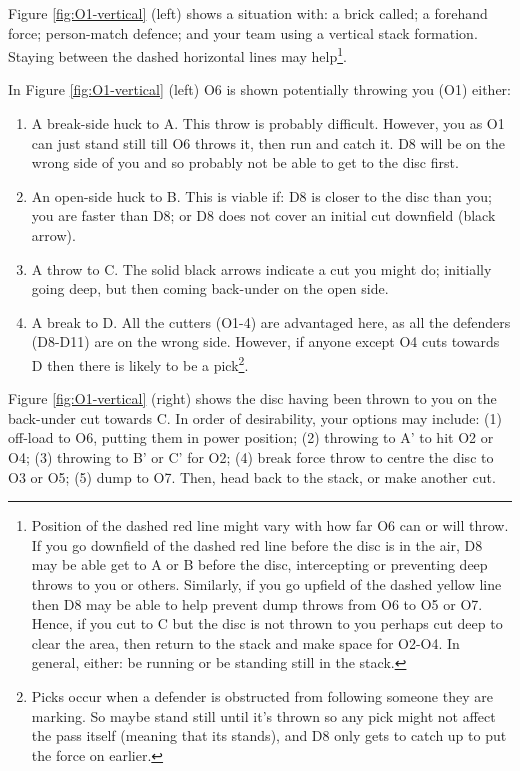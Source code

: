 \documentclass{tufte-handout}
\begin{document}
Figure \ref{fig:O1-vertical} (left) shows 
a situation 
with: 
a brick called;
a forehand force; 
person-match defence; 
and your team using 
a vertical stack formation.
Staying  
between 
the dashed 
horizontal 
lines 
may help\footnote{
Position of 
the dashed red line might vary
with how far O6 
can or will 
throw. 
If you go 
downfield of the dashed red line 
before the disc is in the air,
D8 may be able 
get to
A or B 
before the disc,
intercepting 
or preventing 
deep throws to 
you or others. 
Similarly, 
if you go 
upfield of the dashed yellow line
then D8 may 
be able to help
prevent dump throws from O6
to O5 
or O7.
Hence,
if you cut to C
but the disc is not thrown to you
perhaps cut deep 
to clear the area, 
then return to the stack
and make space for O2-O4. 
In general, 
either: 
be running 
or be standing still 
in the stack.}. 

In Figure \ref{fig:O1-vertical} (left)
O6 is shown
potentially throwing 
you (O1) either:
\begin{enumerate}
\item A break-side 
huck to A.
This throw is 
probably 
difficult. 
However, you as O1
can just
stand still 
till O6 throws it, 
then run and catch it.
D8 will be on the wrong side of you
and so probably 
not be able 
to get to the disc
first.
\item An open-side huck to B. 
This is viable if: 
D8 is closer to the disc than you; 
you are faster than D8; or 
D8 does not cover 
an initial cut downfield (black arrow). 
\item A throw 
to C.
The solid black arrows indicate 
a cut you might do;
initially going deep,
but then coming back-under
on the open side. 
\item A break to D. 
All the cutters 
(O1-4) 
are advantaged here,
as all the defenders 
(D8-D11) 
are on the wrong side.
However,
if anyone 
except O4 
cuts towards D 
then there is likely 
to be a pick\footnote{
Picks occur
when a  
defender is 
obstructed from 
following someone 
they are marking.  
So maybe stand still
until it's thrown 
so any pick 
might not affect the pass itself
(meaning that its stands), 
and D8 
only gets to catch up 
to put the force on earlier.}.
\end{enumerate}

Figure \ref{fig:O1-vertical} (right) shows 
the disc having been thrown to you
on the back-under cut towards C. 
In order of desirability, 
your options may include: 
(1)
off-load to O6, 
putting them in power position;
(2) throwing to A' to hit O2 or O4;
(3) throwing to B' or C' for O2;
(4) break force throw 
to centre the disc
to O3 or O5;
(5) dump to O7.
Then, head back to the stack, 
or make another cut.
\end{document}
